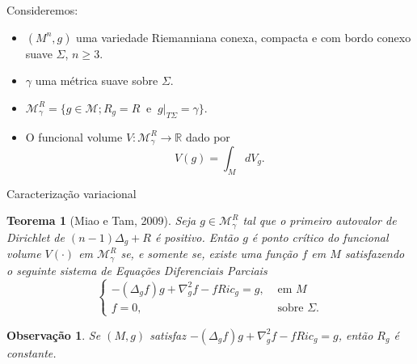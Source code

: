 \documentclass[blue]{beamer}
\newtheorem{thm}{Teorema}
\newtheorem{remark}{Observação}
\begin{document}






\begin{frame}
Consideremos:\pause
\begin{itemize}
	\item $(M^n, g)$ uma variedade Riemanniana conexa, compacta e com bordo conexo suave $\Sigma$, $n\geq 3.$\pause
	\item $\gamma$ uma métrica suave sobre $\Sigma$.\pause
	\item $\mathcal{M}^{R}_{\gamma}=\{g\in \mathcal{M}; R_{g}=R \;\;\mbox{e}\;\; g|_{T\Sigma}=\gamma \}.$ \pause
	\item O funcional volume $V : \mathcal{M}^{R}_{\gamma} \rightarrow \mathbb{R}$ dado por
	$$V(g)=\int_{M}dV_{g}.$$
\end{itemize}
\end{frame}

\begin{frame}{Caracterização variacional}\pause
\begin{thm}[Miao e Tam, 2009]
	Seja $g\in\mathcal{M}_\gamma^{R}$ tal que o primeiro autovalor de Dirichlet de $(n-1)\Delta_{g}+R$ é positivo.
	Então $g$ é ponto crítico do funcional volume $V(\cdot)$ em $\mathcal{M}_\gamma^{R}$ se, e somente se, existe
	uma função $f$ em $M$ satisfazendo o seguinte sistema de Equações Diferenciais Parciais
	\begin{equation*}\label{teomotiveq1}
	\left\{\begin{array}{rr}
	-(\Delta_g f)g+\nabla_g^2f-fRic_g=g, &\mbox{ em } M\\
	f=0, &\mbox{ sobre } \Sigma. \end{array} \right.
	\end{equation*}
\end{thm}\pause
\begin{remark}
	Se $(M,g)$ satisfaz $-(\Delta_g f)g+\nabla_g^2f-fRic_g=g$, então $R_{g}$ é constante.
\end{remark}


\end{frame}
\end{document}
